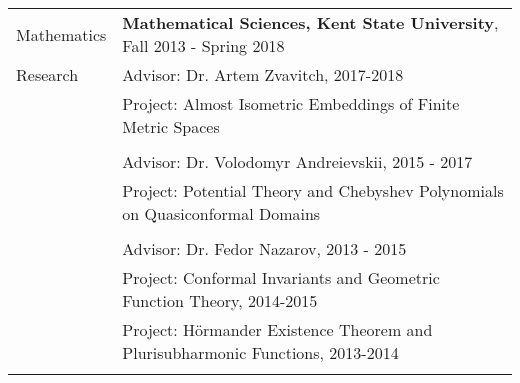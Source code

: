 \documentclass[letterpaper,10pt,oneside]{article}
\begin{document}
\newpage


\noindent \begin{tabular}{@{} l l}
 \Large{Mathematics} & \textbf{Mathematical Sciences, Kent State University}, Fall 2013 - Spring 2018 \\
 \Large{Research} & Advisor: Dr. Artem Zvavitch, 2017-2018 \\
 \hspace{1.1in} & Project: Almost Isometric Embeddings of Finite Metric Spaces \\
 & \\
 & Advisor: Dr. Volodomyr Andreievskii, 2015 - 2017 \\
 & Project: Potential Theory and Chebyshev Polynomials on Quasiconformal Domains \\
 & \\
 & Advisor: Dr. Fedor Nazarov, 2013 - 2015 \\
 & Project: Conformal Invariants and Geometric Function Theory, 2014-2015 \\
 & Project: H\"{o}rmander Existence Theorem and Plurisubharmonic Functions, 2013-2014 \\
 & \\
\end{tabular}

\vfill




\end{document}
